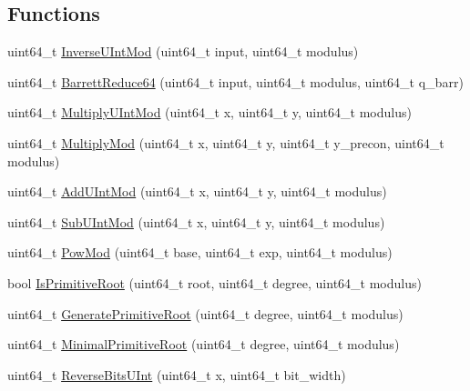 \subsection*{Functions}
\begin{DoxyCompactItemize}
\item 
uint64\-\_\-t \hyperlink{namespacehetest_1_1utils_a3f409e865de8022c3ea069458b3913d6}{Inverse\-U\-Int\-Mod} (uint64\-\_\-t input, uint64\-\_\-t modulus)
\item 
uint64\-\_\-t \hyperlink{namespacehetest_1_1utils_aa75d1b0f92c493fb35ee0fba2ad20861}{Barrett\-Reduce64} (uint64\-\_\-t input, uint64\-\_\-t modulus, uint64\-\_\-t q\-\_\-barr)
\item 
uint64\-\_\-t \hyperlink{namespacehetest_1_1utils_a7e1e09f25d4ed5c4b8ed51fd0e7831e0}{Multiply\-U\-Int\-Mod} (uint64\-\_\-t x, uint64\-\_\-t y, uint64\-\_\-t modulus)
\item 
uint64\-\_\-t \hyperlink{namespacehetest_1_1utils_a05ab63c2edf76c87493770c59b9fbdde}{Multiply\-Mod} (uint64\-\_\-t x, uint64\-\_\-t y, uint64\-\_\-t y\-\_\-precon, uint64\-\_\-t modulus)
\item 
uint64\-\_\-t \hyperlink{namespacehetest_1_1utils_a2703d3db0db5510fac010b973ef9abdf}{Add\-U\-Int\-Mod} (uint64\-\_\-t x, uint64\-\_\-t y, uint64\-\_\-t modulus)
\item 
uint64\-\_\-t \hyperlink{namespacehetest_1_1utils_a3ed335150e26cfd368e40a34e3af2f72}{Sub\-U\-Int\-Mod} (uint64\-\_\-t x, uint64\-\_\-t y, uint64\-\_\-t modulus)
\item 
uint64\-\_\-t \hyperlink{namespacehetest_1_1utils_af4225e8fb310a252be626d55547299a4}{Pow\-Mod} (uint64\-\_\-t base, uint64\-\_\-t exp, uint64\-\_\-t modulus)
\item 
bool \hyperlink{namespacehetest_1_1utils_ae86c27a5d75d8b02cfb9b17eae7251a7}{Is\-Primitive\-Root} (uint64\-\_\-t root, uint64\-\_\-t degree, uint64\-\_\-t modulus)
\item 
uint64\-\_\-t \hyperlink{namespacehetest_1_1utils_ab90a6b556a35edc30cdef194aefad1a6}{Generate\-Primitive\-Root} (uint64\-\_\-t degree, uint64\-\_\-t modulus)
\item 
uint64\-\_\-t \hyperlink{namespacehetest_1_1utils_a1f9bf85bb99c3f6d6b9a72c3c2e85d3e}{Minimal\-Primitive\-Root} (uint64\-\_\-t degree, uint64\-\_\-t modulus)
\item 
uint64\-\_\-t \hyperlink{namespacehetest_1_1utils_af9582ceaf67142fca2879962168298f6}{Reverse\-Bits\-U\-Int} (uint64\-\_\-t x, uint64\-\_\-t bit\-\_\-width)
\item 

\end{DoxyCompactItemize}
